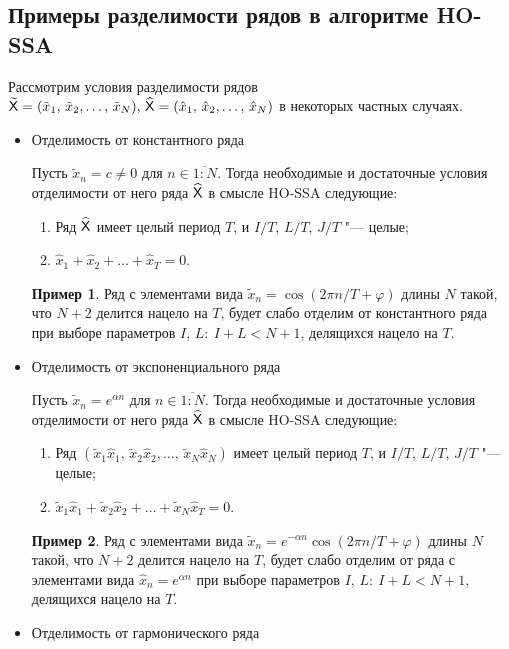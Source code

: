 \documentclass[specialist,
    substylefile = spbu.rtx,
    subf,href,colorlinks=true, 12pt]{disser}
\theoremstyle{plain}
\theoremstyle{definition}
\newtheorem{example}{Пример}[section]
\theoremstyle{remark}
\begin{document}
    \subsection{Примеры разделимости рядов в алгоритме HO-SSA}\label{subsec:separation-example}
    Рассмотрим условия разделимости рядов $\widetilde{\mathsf{X}}=(\tilde{x}_{1},\, \tilde{x}_{2},\ldots,\, \tilde{x}_{N}),\, \widehat{\mathsf{X}}=
    (\hat{x}_{1},\, \hat{x}_{2},\ldots,\, \hat{x}_{N})$ в некоторых частных случаях.
    \begin{itemize}
        \item Отделимость от константного ряда

        Пусть $\tilde{x}_n=c\ne 0$ для $n\in\overline{1:N}$.
        Тогда необходимые и достаточные условия отделимости от него ряда $\widehat{\mathsf{X}}$ в смысле HO-SSA следующие:
        \begin{enumerate}
            \item Ряд $\widehat{\mathsf{X}}$ имеет целый период $T$, и $I/T$, $L/T$, $J/T$ "--- целые;
            \item $\hat{x}_{1}+\hat{x}_2+\ldots+\hat{x}_T=0$.
        \end{enumerate}
        \begin{example}
            Ряд с элементами вида $\tilde{x}_n=\cos(2\pi n / T + \varphi)$ длины $N$ такой, что $N+2$ делится нацело на
            $T$, будет слабо отделим от константного ряда при выборе параметров $I,\, L:\: I+L< N+1$, делящихся нацело на $T$.
        \end{example}
        \item Отделимость от экспоненциального ряда

        Пусть $\tilde{x}_n=e^{\alpha n}$ для $n\in\overline{1:N}$.
        Тогда необходимые и достаточные условия отделимости от него ряда $\widehat{\mathsf{X}}$ в смысле HO-SSA следующие:
        \begin{enumerate}
            \item Ряд $(\tilde{x}_{1}\hat{x}_{1},\, \tilde{x}_{2}\hat{x}_{2},\ldots,\, \tilde{x}_{N}\hat{x}_{N})$
            имеет целый период $T$, и $I/T$, $L/T$, $J/T$ "--- целые;
            \item $\tilde{x}_{1}\hat{x}_{1}+\tilde{x}_{2}\hat{x}_2+\ldots+\tilde{x}_{N}\hat{x}_T=0$.
        \end{enumerate}
        \begin{example}
            Ряд с элементами вида $\tilde{x}_n=e^{-\alpha n}\cos(2\pi n / T + \varphi)$ длины $N$ такой, что $N+2$ делится нацело на
            $T$, будет слабо отделим от ряда с элементами вида $\hat{x}_n=e^{\alpha n}$ при выборе параметров $I,\, L:\: I+L< N+1$, делящихся нацело на $T$.
        \end{example}
        \item Отделимость от гармонического ряда


\end{itemize}
\end{document}
